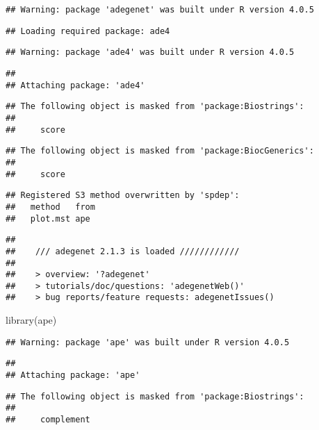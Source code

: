 \documentclass[
]{article}
\newenvironment{Shaded}{\begin{snugshade}}{\end{snugshade}}
\newcommand{\FunctionTok}[1]{\textcolor[rgb]{0.00,0.00,0.00}{#1}}
\newcommand{\NormalTok}[1]{#1}
\begin{document}
\begin{verbatim}
## Warning: package 'adegenet' was built under R version 4.0.5
\end{verbatim}

\begin{verbatim}
## Loading required package: ade4
\end{verbatim}

\begin{verbatim}
## Warning: package 'ade4' was built under R version 4.0.5
\end{verbatim}

\begin{verbatim}
## 
## Attaching package: 'ade4'
\end{verbatim}

\begin{verbatim}
## The following object is masked from 'package:Biostrings':
## 
##     score
\end{verbatim}

\begin{verbatim}
## The following object is masked from 'package:BiocGenerics':
## 
##     score
\end{verbatim}

\begin{verbatim}
## Registered S3 method overwritten by 'spdep':
##   method   from
##   plot.mst ape
\end{verbatim}

\begin{verbatim}
## 
##    /// adegenet 2.1.3 is loaded ////////////
## 
##    > overview: '?adegenet'
##    > tutorials/doc/questions: 'adegenetWeb()' 
##    > bug reports/feature requests: adegenetIssues()
\end{verbatim}

\begin{Shaded}
\begin{Highlighting}[]
\FunctionTok{library}\NormalTok{(ape)}
\end{Highlighting}
\end{Shaded}

\begin{verbatim}
## Warning: package 'ape' was built under R version 4.0.5
\end{verbatim}

\begin{verbatim}
## 
## Attaching package: 'ape'
\end{verbatim}

\begin{verbatim}
## The following object is masked from 'package:Biostrings':
## 
##     complement
\end{verbatim}
\end{document}
